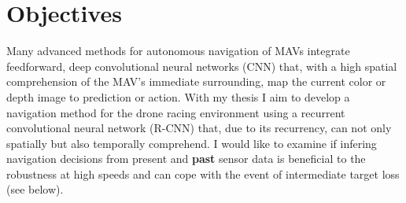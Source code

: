 \chapter{Objectives}\label{cha:objectives}

Many advanced methods for autonomous navigation of MAVs
integrate feedforward, deep convolutional neural networks (CNN)
that, 
with a high spatial comprehension of the MAV's immediate surrounding, 
map the current color or depth image to prediction or action.
With my thesis I aim to develop a navigation method for the drone racing environment
using a recurrent convolutional neural network (R-CNN)
that, due to its recurrency, can not only spatially but also temporally comprehend.
I would like to examine if infering navigation decisions from present and \textbf{past} sensor data
is beneficial to the robustness at high speeds and can cope with the event of intermediate target loss (see below).

